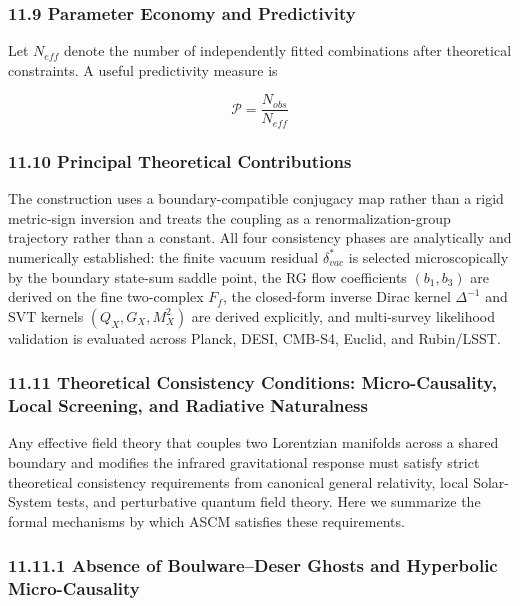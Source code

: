 \documentclass[aps,prd,onecolumn,superscriptaddress,nofootinbib,longbibliography,10pt]{revtex4-2}
\begin{document}
  
\subsubsection*{11.9 Parameter Economy and Predictivity}

  Let \(N_{eff}\) denote the number of independently fitted combinations after theoretical constraints. A useful predictivity measure is


  \[ \mathcal{P} = \frac{N_{obs}}{N_{eff}} \]

  
\subsubsection*{11.10 Principal Theoretical Contributions}

  The construction uses a boundary-compatible conjugacy map rather than a rigid metric-sign inversion and treats the coupling as a renormalization-group trajectory rather than a constant. All four consistency phases are analytically and numerically established: the finite vacuum residual \(\delta_{vac}^*\) is selected microscopically by the boundary state-sum saddle point, the RG flow coefficients \((b_1, b_3)\) are derived on the fine two-complex \(F_f\), the closed-form inverse Dirac kernel \(\Delta^{-1}\) and SVT kernels \((Q_X, G_X, M_X^2)\) are derived explicitly, and multi-survey likelihood validation is evaluated across Planck, DESI, CMB-S4, Euclid, and Rubin/LSST.



  
\subsubsection*{11.11 Theoretical Consistency Conditions: Micro-Causality, Local Screening, and Radiative Naturalness}

  Any effective field theory that couples two Lorentzian manifolds across a shared boundary and modifies the infrared gravitational response must satisfy strict theoretical consistency requirements from canonical general relativity, local Solar-System tests, and perturbative quantum field theory. Here we summarize the formal mechanisms by which ASCM satisfies these requirements.


  
\subsubsection*{11.11.1 Absence of Boulware–Deser Ghosts and Hyperbolic Micro-Causality}
\end{document}
